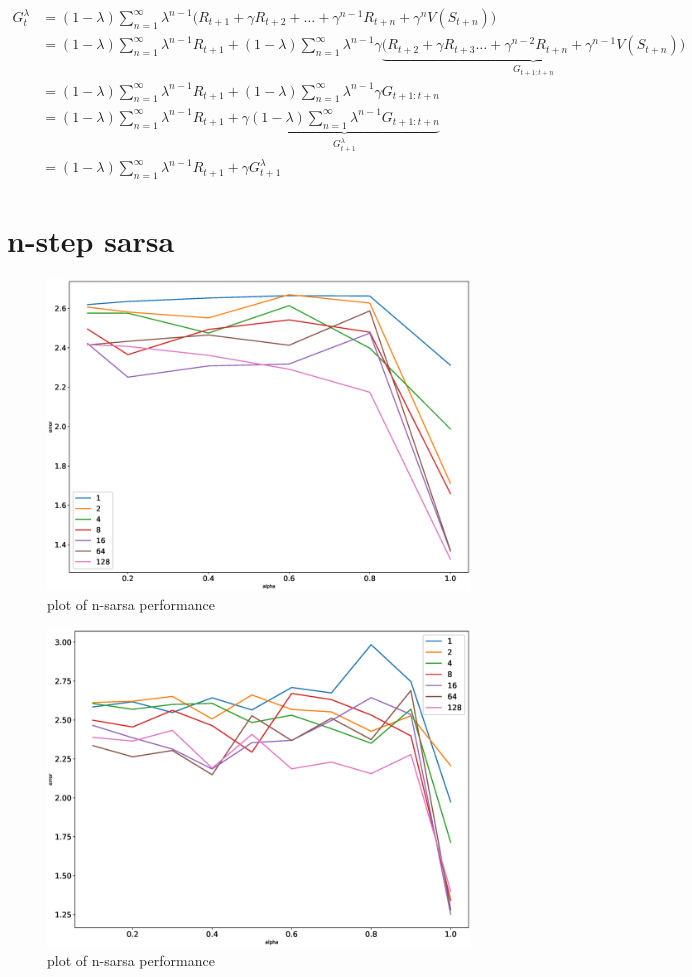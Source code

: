 \documentclass[11pt,a4paper]{article}
\begin{document}
\begin{align*}
  G_{t}^{\lambda} &= (1-\lambda) \sum_{n=1}^{\infty} \lambda^{n-1} \bigl( 
  R_{t+1} + \gamma R_{t+2} + \dots + \gamma^{n-1} R_{t+n} + \gamma^{n} V(S_{t+n}) \bigr) \\
  &= (1-\lambda) \sum_{n=1}^{\infty} \lambda^{n-1}R_{t+1} + 
  (1-\lambda) \sum_{n=1}^{\infty} \lambda^{n-1}\gamma \underbrace{\bigl( R_{t+2} + 
  \gamma R_{t+3}\dots + \gamma^{n-2} R_{t+n} + \gamma^{n-1} V(S_{t+n}) \bigr)}_{ G_{t+1:t+n}} \\
  &= (1-\lambda) \sum_{n=1}^{\infty} \lambda^{n-1}R_{t+1} +
  (1-\lambda) \sum_{n=1}^{\infty} \lambda^{n-1}\gamma G_{t+1:t+n} \\
  &= (1-\lambda) \sum_{n=1}^{\infty} \lambda^{n-1}R_{t+1} +
  \gamma \underbrace{(1-\lambda) \sum_{n=1}^{\infty} \lambda^{n-1} G_{t+1:t+n}}_{G_{t+1}^{\lambda}} \\
  &= (1-\lambda) \sum_{n=1}^{\infty} \lambda^{n-1} R_{t+1} + \gamma G_{t+1}^{\lambda}
\end{align*}

\vspace{20pt}


\section{n-step sarsa}

\begin{figure}[h!]
  \includegraphics[width=.75\textwidth]{plots_v1.eps}
  \centering
  \caption{plot of n-sarsa performance}
  \label{fig2}
\end{figure}

\newpage


\begin{figure}[h!]
  \includegraphics[width=.75\textwidth]{plots_v2.eps}
  \centering
  \caption{plot of n-sarsa performance}
  \label{fig2}
\end{figure}
\end{document}
